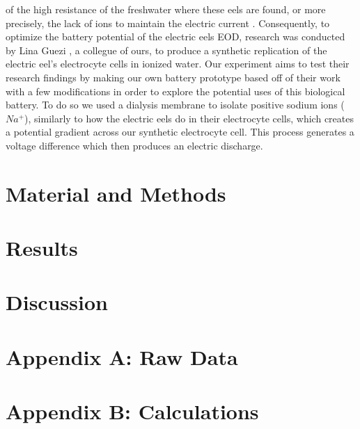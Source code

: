 \documentclass[letterpaper]{article}
\begin{document}
of the high resistance of the freshwater where these eels are found, or more precisely, the lack of 
ions to maintain the electric current \parencite{boisseletBiomimeticPotentialElectric2017}. 
Consequently, to optimize the battery potential of the electric eels EOD, research was conducted 
by Lina Guezi \parencite{gueziTheoreticalExaminationConception2023}, a collegue of ours, to produce 
a synthetic replication of the electric eel’s electrocyte 
cells in ionized water. Our experiment aims to test their research findings by making our own battery prototype based off of their work with a few modifications in order to explore 
the potential uses of this biological battery. To do so we used a dialysis membrane to isolate positive sodium ions ( $Na^+$), similarly to how the electric eels do in their
electrocyte cells, which creates a potential gradient across our synthetic electrocyte cell. This process generates a voltage difference 
which then produces an electric discharge.

\section{Material and Methods}
\label{sec:matandmet}

\section{Results}
\label{sec:results}

\section{Discussion}
\label{sec:discussion}

\printbibliography[heading=bibintoc]

\section*{Appendix A: Raw Data}
\label{sec:appendixa}

\section*{Appendix B: Calculations}
\label{sec:appendixb}
\end{document}
